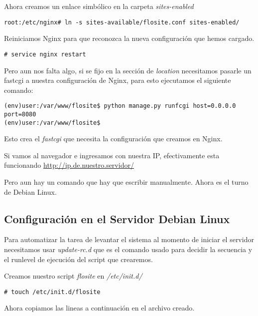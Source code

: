Ahora creamos un enlace simbólico en la carpeta {\it sites-enabled}

\begin{verbatim}
root:/etc/nginx# ln -s sites-available/flosite.conf sites-enabled/
\end{verbatim}

Reiniciamos Nginx para que reconozca la nueva configuración que hemos cargado.

\begin{verbatim}
# service nginx restart
\end{verbatim}

Pero aun nos falta algo, si se fijo en la sección de {\it location} necesitamos
pasarle un fastcgi a nuestra configuración de Nginx, para esto ejecutamos el
siguiente comando:

\begin{verbatim}
(env)user:/var/www/flosite$ python manage.py runfcgi host=0.0.0.0 port=8080
(env)user:/var/www/flosite$
\end{verbatim}

Esto crea el {\it fastcgi} que necesita la configuración que creamos en Nginx.

Si vamos al navegador e ingresamos con nuestra IP, efectivamente esta funcionando
\url{http://ip.de.nuestro.servidor/}

Pero aun hay un comando que hay que escribir manualmente. Ahora es el turno de
Debian Linux.

\subsection{Configuración en el Servidor Debian Linux}
Para automatizar la tarea de levantar el sistema al momento de iniciar el servidor
necesitamos usar {\it update-rc.d} que es el comando usado para decidir la secuencia
y el runlevel de ejecución del script que crearemos.

Creamos nuestro script {\it flosite} en {\it /etc/init.d/}

\begin{verbatim}
# touch /etc/init.d/flosite
\end{verbatim}

Ahora copiamos las lineas a continuación en el archivo creado.

